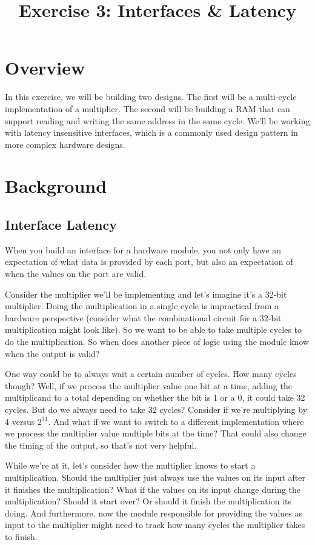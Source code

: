 \documentclass{article}
\begin{document}
\title{Exercise 3: Interfaces \& Latency}
\date{}
\maketitle

\section*{Overview}
In this exercise, we will be building two designs. The first will be a
multi-cycle implementation of a multiplier. The second will be building a RAM
that can support reading and writing the same address in the same cycle. We'll
be working with latency insensitive interfaces, which is a commonly used design
pattern in more complex hardware designs.

\section*{Background}
\subsection*{Interface Latency}
When you build an interface for a hardware module, you not only have an
expectation of what data is provided by each port, but also an expectation
of when the values on the port are valid. 

Consider the multiplier we'll be implementing and let's imagine it's a 32-bit
multiplier. Doing the multiplication in a single cycle is impractical from a
hardware perspective (consider what the combinational circuit for a 32-bit
multiplication might look like). So we want to be able to take multiple cycles
to do the multiplication. So when does another piece of logic using the module
know when the output is valid?

One way could be to always wait a certain number of cycles. How many cycles though?
Well, if we process the multiplier value one bit at a time, adding the
multiplicand to a total depending on whether the bit is 1 or a 0, it could take 32
cycles. But do we always need to take 32 cycles? Consider if we're multiplying
by 4 versus $2^31$. And what if we want to switch to a different implementation
where we process the multiplier value multiple bits at the time? That could also
change the timing of the output, so that's not very helpful.

While we're at it, let's consider how the multiplier knows to start a
multiplication. Should the multiplier just always use the values on its input
after it finishes the multiplication? What if the values on its input change
during the multiplication? Should it start over? Or should it finish the
multiplication its doing. And furthermore, now the module responsible for
providing the values as input to the multiplier might need to track how many
cycles the multiplier takes to finish. 
\end{document}

